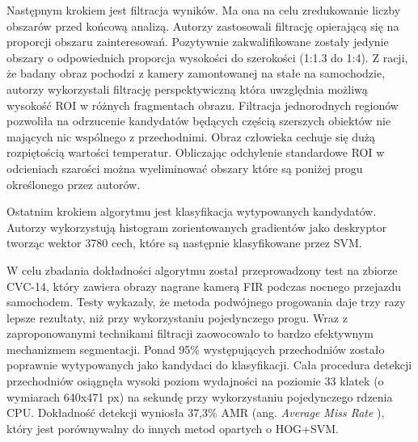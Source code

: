 Następnym krokiem jest filtracja wyników. 
Ma ona na celu zredukowanie liczby obszarów przed końcową analizą. 
Autorzy zastosowali filtrację opierającą się na proporcji obszaru zainteresowań. 
Pozytywnie zakwalifikowane zostały jedynie obszary o odpowiednich proporcja wysokości do szerokości (1:1.3 do 1:4). 
Z racji, że badany obraz pochodzi z kamery zamontowanej na stałe na samochodzie, autorzy wykorzystali filtrację perspektywiczną która uwzględnia możliwą wysokość ROI w różnych fragmentach obrazu. %
Filtracja jednorodnych regionów pozwoliła na odrzucenie kandydatów będących częścią szerszych obiektów nie mających nic wspólnego z przechodnimi. Obraz człowieka cechuje się dużą rozpiętością wartości temperatur. Obliczając odchylenie standardowe ROI w odcieniach szarości można wyeliminować obszary które są poniżej progu określonego przez autorów.  %

Ostatnim krokiem algorytmu jest klasyfikacja wytypowanych kandydatów. 
Autorzy wykorzystują histogram zorientowanych gradientów jako deskryptor tworząc wektor 3780 cech, które są następnie klasyfikowane przez SVM.

W celu zbadania dokładności algorytmu został przeprowadzony test na zbiorze CVC-14, który zawiera obrazy nagrane kamerą FIR podczas nocnego przejazdu samochodem. 
Testy wykazały, że metoda podwójnego progowania daje trzy razy lepsze rezultaty, niż przy wykorzystaniu pojedynczego progu.  Wraz z zaproponowanymi technikami filtracji zaowocowało to bardzo efektywnym mechanizmem segmentacji. Ponad 95\% występujących przechodniów zostało poprawnie wytypowanych jako kandydaci do klasyfikacji. 
Cała procedura detekcji przechodniów osiągnęła wysoki poziom wydajności na poziomie 33 klatek (o wymiarach 640x471 px) na sekundę przy wykorzystaniu pojedynczego rdzenia CPU. Dokładność detekcji wyniosła 37,3\% AMR
(ang. \textit{ Average Miss Rate }), który jest porównywalny do innych metod opartych o HOG+SVM.

